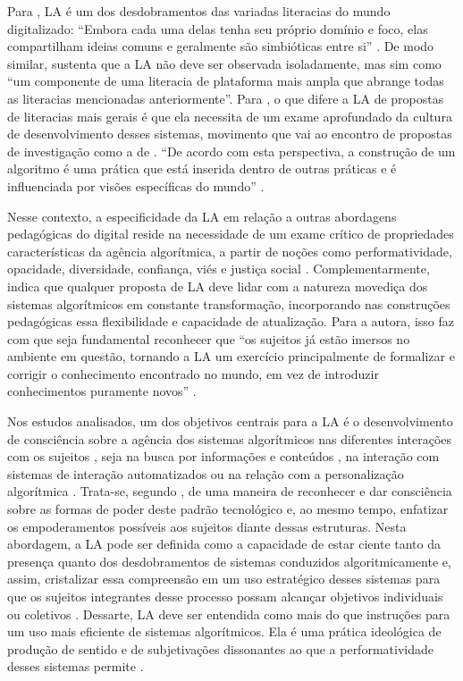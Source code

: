 Para \textcite[p.~3]{Ridley2021}, LA é um dos desdobramentos das
variadas literacias do mundo digitalizado: ``Embora cada uma delas tenha
seu próprio domínio e foco, elas compartilham ideias comuns e geralmente
são simbióticas entre si'' \textcite[p.~3]{Ridley2021}. De modo
similar, \textcite[p.~30]{Devito2021} sustenta que a LA não deve ser observada
isoladamente, mas sim como ``um componente de uma literacia de
plataforma mais ampla que abrange todas as literacias mencionadas
anteriormente''. Para \cite{Lloyd2019}, o que difere a LA de propostas de
literacias mais gerais é que ela necessita de um exame aprofundado da
cultura de desenvolvimento desses sistemas, movimento que vai ao
encontro de propostas de investigação como a de \textcite{Seaver2017}. ``De
acordo com esta perspectiva, a construção de um algoritmo é uma prática
que está inserida dentro de outras práticas e é influenciada por visões
específicas do mundo'' \cite[p.~1483]{Lloyd2019}.

Nesse contexto, a especificidade da LA em relação a outras abordagens
pedagógicas do digital reside na necessidade de um exame crítico de
propriedades características da agência algorítmica, a partir de noções
como performatividade, opacidade, diversidade, confiança, viés e justiça
social \cite{Lloyd2019}. Complementarmente, \textcite{Devito2021} indica que
qualquer proposta de LA deve lidar com a natureza movediça dos sistemas
algorítmicos em constante transformação, incorporando nas construções
pedagógicas essa flexibilidade e capacidade de atualização. Para a
autora, isso faz com que seja fundamental reconhecer que ``os sujeitos
já estão imersos no ambiente em questão, tornando a LA um exercício
principalmente de formalizar e corrigir o conhecimento encontrado no
mundo, em vez de introduzir conhecimentos puramente novos'' \cite[p.~3–4]{Devito2021}.

Nos estudos analisados, um dos objetivos centrais para a LA é o
desenvolvimento de consciência sobre a agência dos sistemas algorítmicos
nas diferentes interações com os sujeitos \cite{Bakke2020}, seja na busca
por informações e conteúdos \cite{Kampa2021}, na interação com
sistemas de interação automatizados \cite{Shin2022} ou na relação com a
personalização algorítmica \cite{Devito2021,Lv2022,Bell2023}. Trata-se, segundo \textcite{Ridley2021},
de uma maneira de reconhecer e dar consciência sobre as formas de poder
deste padrão tecnológico e, ao mesmo tempo, enfatizar os empoderamentos
possíveis aos sujeitos diante dessas estruturas. Nesta abordagem, a LA
pode ser definida como a capacidade de estar ciente tanto da presença
quanto dos desdobramentos de sistemas conduzidos algoritmicamente e,
assim, cristalizar essa compreensão em um uso estratégico desses
sistemas para que os sujeitos integrantes desse processo possam alcançar
objetivos individuais ou coletivos \cite{Devito2021}. Dessarte, LA deve ser
entendida como mais do que instruções para um uso mais eficiente de
sistemas algorítmicos. Ela é uma prática ideológica de produção de
sentido e de subjetivações dissonantes ao que a performatividade desses
sistemas permite \cite{Ridley2021}.

